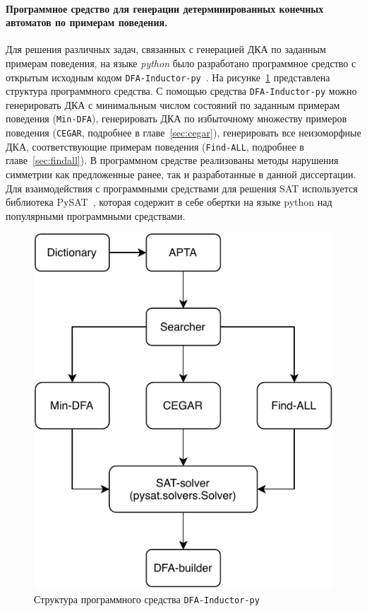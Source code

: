
\paragraph*{Программное средство для генерации детерминированных конечных автоматов по примерам поведения.}
Для решения различных задач, связанных с генерацией ДКА по заданным примерам поведения, на языке \emph{python} было разработано программное средство с открытым исходным кодом \texttt{DFA-Inductor-py}~\cite{dfa-inductor-py}.
На рисунке~\ref{img:scheme} представлена структура программного средства.
С помощью средства \texttt{DFA-Inductor-py} можно генерировать ДКА с минимальным числом состояний по заданным примерам поведения (\texttt{Min-DFA}), генерировать ДКА по избыточному множеству примеров поведения (\texttt{CEGAR}, подробнее в главе~\ref{sec:cegar}), генерировать все неизоморфные ДКА, соответствующие примерам поведения (\texttt{Find-ALL}, подробнее в главе~\ref{sec:findall}).
В программном средстве реализованы методы нарушения симметрии как предложенные ранее, так и разработанные в данной диссертации.
Для взаимодействия с программными средствами для решения SAT используется библиотека PySAT~\cite{imms-sat18}, которая содержит в себе обертки на языке python над популярными программными средствами.

\begin{figure}[ht]
  \centering
  \includegraphics{img/scheme.pdf}
  \caption{Структура программного средства \texttt{DFA-Inductor-py}}
  \label{img:scheme}
\end{figure}

